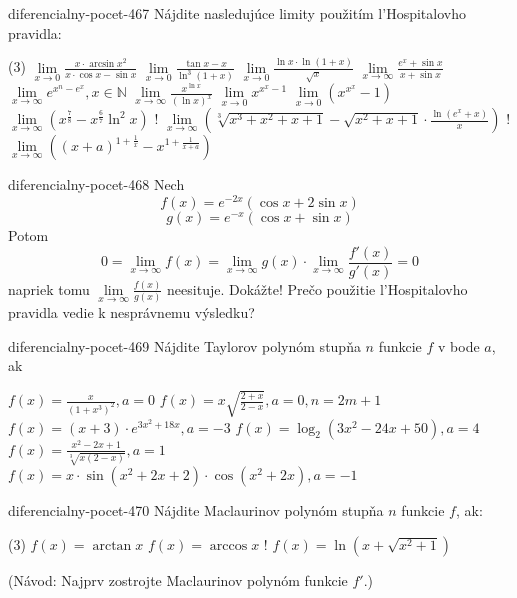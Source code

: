 \begin{defproblem}{diferencialny-pocet-467}
Nájdite nasledujúce limity použitím l'Hospitalovho pravidla:
\begin{tasks}(3)
  \task $\lim\limits_{x \rightarrow 0}\frac{x\cdot\arcsin x^2}{x\cdot\cos x -\sin x}$
  \task $\lim\limits_{x \rightarrow 0}\frac{\tan x -x}{\ln^3 (1+x)}$
  \task $\lim\limits_{x \rightarrow 0}\frac{\ln x\cdot\ln (1+x)}{\sqrt{x}}$
  \task $\lim\limits_{x \rightarrow \infty}\frac{e^x+\sin x}{x+\sin x}$
  \task $\lim\limits_{x \rightarrow \infty}e^{x^n-e^x},x\in\mathbb{N}$
  \task $\lim\limits_{x \rightarrow \infty}\frac{x^{\ln x}}{(\ln x)^x}$
  \task $\lim\limits_{x \rightarrow 0}x^{x^x-1}$
  \task $\lim\limits_{x \rightarrow 0}(x^{x^x}-1)$
  \task $\lim\limits_{x \rightarrow \infty}(x^{\frac{7}{8}}-x^{\frac{6}{7}}\ln^2 x)$
  \task! $\lim\limits_{x \rightarrow \infty}(\sqrt[3]{x^3+x^2+x+1}-\sqrt{x^2+x+1}\cdot\frac{\ln (e^x+x)}{x})$
  \task! $\lim\limits_{x \rightarrow \infty}((x+a)^{1+\frac{1}{x}}-x^{1+\frac{1}{x+a}})$
\end{tasks}
\end{defproblem}

\begin{defproblem}{diferencialny-pocet-468}
Nech
\[
  f(x)=e^{-2x}(\cos x+2\sin x)
\]
\[
  g(x)=e^{-x}(\cos x +\sin x)
\]
Potom
\[
  0 = \lim_{x\rightarrow\infty}f(x)
    = \lim_{x\rightarrow\infty}g(x)\cdot\lim_{x\rightarrow\infty}\frac{f'(x)}{g'(x)}
    = 0
\]
napriek tomu $\lim\limits_{x \rightarrow \infty}\frac{f(x)}{g(x)}$ neesituje.
Dokážte! Prečo použitie l'Hospitalovho pravidla vedie k nesprávnemu výsledku?
\end{defproblem}

\begin{defproblem}{diferencialny-pocet-469}
Nájdite Taylorov polynóm stupňa $n$ funkcie $f$ v bode $a$, ak
\begin{tasks}
  \task $f(x)=\frac{x}{(1+x^3)^2},a=0$
  \task $f(x)=x\sqrt{\frac{2+x}{2-x}},a=0,n=2m+1$
  \task $f(x)=(x+3)\cdot e^{3x^2+18x},a=-3$
  \task $f(x)=\log_2(3x^2-24x+50),a=4$
  \task $f(x)=\frac{x^2-2x+1}{\sqrt[3]{x(2-x)}},a=1$
  \task $f(x)=x\cdot\sin (x^2+2x+2)\cdot\cos (x^2+2x),a=-1$
\end{tasks}
\end{defproblem}

\begin{defproblem}{diferencialny-pocet-470}
Nájdite Maclaurinov polynóm stupňa $n$ funkcie $f$, ak:
\begin{tasks}(3)
  \task $f(x)=\arctan x$
  \task $f(x)=\arccos x$
  \task! $f(x)=\ln (x+\sqrt{x^2+1})$
\end{tasks}
(Návod: Najprv zostrojte Maclaurinov polynóm funkcie $f'$.)
\end{defproblem}

